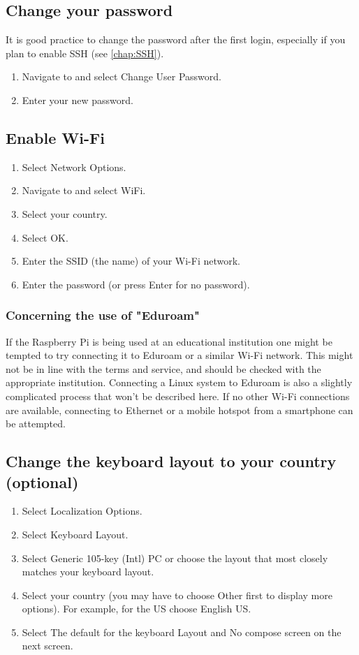 \medskip


\bigskip

\subsection{Change your password}
It is good practice to change the password after the first login, especially if you plan to enable SSH (see \autoref{chap:SSH}).

\begin{enumerate}
	\item Navigate to and select Change User Password.
	\item Enter your new password.
\end{enumerate}

\subsection{Enable Wi-Fi}
\begin{enumerate}
	\item Select Network Options.
	\item Navigate to and select WiFi.
	\item Select your country.
	\item Select OK.
	\item Enter the SSID (the name) of your Wi-Fi network.
	\item Enter the password (or press Enter for no password).
\end{enumerate}

\subsubsection{Concerning the use of "Eduroam"}
If the Raspberry Pi is being used at an educational institution one might be tempted to try connecting it to Eduroam or a similar Wi-Fi network. This might not be in line with the terms and service, and should be checked with the appropriate institution. Connecting a Linux system to Eduroam is also a slightly complicated process that won't be described here. If no other Wi-Fi connections are available, connecting to Ethernet or a mobile hotspot from a smartphone can be attempted.


\subsection{Change the keyboard layout to your country (optional)}
\begin{enumerate}
	\item Select Localization Options.
	\item Select Keyboard Layout.
	\item Select Generic 105-key (Intl) PC or choose the layout that most closely matches your keyboard layout.
	\item Select your country (you may have to choose Other first to display more options). For example, for the US choose English US.
	\item Select The default for the keyboard Layout and No compose screen on the next screen.
\end{enumerate}

